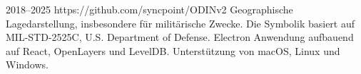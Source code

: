 \cventry
{2018--2025}
{https://github.com/syncpoint/ODINv2}
{}
{}
{}
{
  Geographische Lagedarstellung, insbesondere für militärische Zwecke. Die Symbolik
  basiert auf MIL-STD-2525C, U.S. Department of Defense. Electron Anwendung aufbauend auf
  React, OpenLayers und LevelDB. Unterstützung von macOS, Linux und Windows.
}
